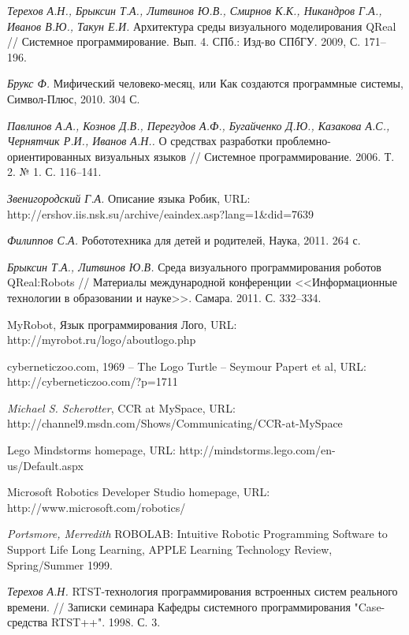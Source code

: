 \documentclass[a4paper]{article}
\begin{document}
\begin{thebibliography}{9001}

   \emph{Терехов А.Н., Брыксин Т.А., Литвинов Ю.В., Смирнов К.К., Никандров Г.А., Иванов В.Ю., Такун Е.И.} Архитектура среды визуального моделирования QReal // Системное программирование. Вып. 4. СПб.: Изд-во СПбГУ. 2009, С. 171--196.

   \emph{Брукс Ф.} Мифический человеко-месяц, или Как создаются программные системы, Символ-Плюс, 2010. 304 С.

   \emph{Павлинов А.А., Кознов Д.В., Перегудов А.Ф., Бугайченко Д.Ю., Казакова А.С., Чернятчик Р.И., Иванов А.Н..} О средствах разработки проблемно-ориентированных визуальных языков // Системное программирование. 2006. Т. 2. № 1. С. 116--141.

   \emph{Звенигородский Г.А.} Описание языка Робик, URL: http://ershov.iis.nsk.su/archive/eaindex.asp?lang=1\&did=7639 

   \emph{Филиппов С.А.} Робототехника для детей и родителей, Наука, 2011. 264 с.

   \emph{Брыксин Т.А., Литвинов Ю.В.} Среда визуального программирования роботов QReal:Robots // Материалы международной конференции <<Информационные технологии в образовании и науке>>. Самара. 2011. С. 332--334.

   MyRobot, Язык программирования Лого, URL: http://myrobot.ru/logo/aboutlogo.php   

   cyberneticzoo.com, 1969 – The Logo Turtle – Seymour Papert et al, URL: http://cyberneticzoo.com/?p=1711 

   \emph{Michael S. Scherotter}, CCR at MySpace, URL: http://channel9.msdn.com/Shows/Communicating/CCR-at-MySpace 

   Lego Mindstorms homepage, URL: http://mindstorms.lego.com/en-us/Default.aspx

   Microsoft Robotics Developer Studio homepage, URL: http://www.microsoft.com/robotics/ 

   \emph{Portsmore, Merredith} ROBOLAB: Intuitive Robotic Programming Software to Support Life Long Learning, APPLE Learning Technology Review, Spring/Summer 1999.

   \emph{Терехов А.Н.}  RTST-технология программирования встроенных систем реального времени. // Записки семинара Кафедры системного программирования "Case-средства RTST++". 1998. С. 3.


\end{thebibliography}
\end{document}
